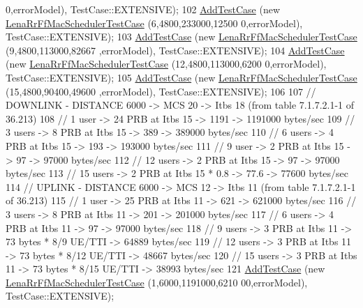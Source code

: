 \begin{DoxyCode}
      0,errorModel), TestCase::EXTENSIVE);
102   \hyperlink{classns3_1_1TestCase_a3718088e3eefd5d6454569d2e0ddd835}{AddTestCase} (\textcolor{keyword}{new} \hyperlink{classLenaRrFfMacSchedulerTestCase}{LenaRrFfMacSchedulerTestCase} (6,4800,233000,12500
      0,errorModel), TestCase::EXTENSIVE);
103   \hyperlink{classns3_1_1TestCase_a3718088e3eefd5d6454569d2e0ddd835}{AddTestCase} (\textcolor{keyword}{new} \hyperlink{classLenaRrFfMacSchedulerTestCase}{LenaRrFfMacSchedulerTestCase} (9,4800,113000,82667
      ,errorModel), TestCase::EXTENSIVE);
104   \hyperlink{classns3_1_1TestCase_a3718088e3eefd5d6454569d2e0ddd835}{AddTestCase} (\textcolor{keyword}{new} \hyperlink{classLenaRrFfMacSchedulerTestCase}{LenaRrFfMacSchedulerTestCase} (12,4800,113000,6200
      0,errorModel), TestCase::EXTENSIVE);
105   \hyperlink{classns3_1_1TestCase_a3718088e3eefd5d6454569d2e0ddd835}{AddTestCase} (\textcolor{keyword}{new} \hyperlink{classLenaRrFfMacSchedulerTestCase}{LenaRrFfMacSchedulerTestCase} (15,4800,90400,49600
      ,errorModel), TestCase::EXTENSIVE);
106 
107   \textcolor{comment}{// DOWNLINK - DISTANCE 6000 -> MCS 20 -> Itbs 18 (from table 7.1.7.2.1-1 of 36.213)}
108   \textcolor{comment}{// 1 user -> 24 PRB at Itbs 15 -> 1191 -> 1191000 bytes/sec}
109   \textcolor{comment}{// 3 users -> 8 PRB at Itbs 15 -> 389 -> 389000 bytes/sec}
110   \textcolor{comment}{// 6 users -> 4 PRB at Itbs 15 -> 193 -> 193000 bytes/sec}
111   \textcolor{comment}{// 9 user -> 2 PRB at Itbs 15 -> 97 -> 97000 bytes/sec}
112   \textcolor{comment}{// 12 users -> 2 PRB at Itbs 15 -> 97 -> 97000 bytes/sec}
113   \textcolor{comment}{// 15 users -> 2 PRB at Itbs 15 * 0.8 -> 77.6 -> 77600 bytes/sec}
114   \textcolor{comment}{// UPLINK - DISTANCE 6000 -> MCS 12 -> Itbs 11 (from table 7.1.7.2.1-1 of 36.213)}
115   \textcolor{comment}{// 1 user -> 25 PRB at Itbs 11 -> 621 -> 621000 bytes/sec}
116   \textcolor{comment}{// 3 users -> 8 PRB at Itbs 11 -> 201 -> 201000 bytes/sec}
117   \textcolor{comment}{// 6 users -> 4 PRB at Itbs 11 -> 97 -> 97000 bytes/sec}
118   \textcolor{comment}{// 9 users -> 3 PRB at Itbs 11 -> 73 bytes * 8/9 UE/TTI -> 64889 bytes/sec}
119   \textcolor{comment}{// 12 users -> 3 PRB at Itbs 11 -> 73 bytes * 8/12 UE/TTI -> 48667 bytes/sec}
120   \textcolor{comment}{// 15 users -> 3 PRB at Itbs 11 -> 73 bytes * 8/15 UE/TTI -> 38993 bytes/sec}
121   \hyperlink{classns3_1_1TestCase_a3718088e3eefd5d6454569d2e0ddd835}{AddTestCase} (\textcolor{keyword}{new} \hyperlink{classLenaRrFfMacSchedulerTestCase}{LenaRrFfMacSchedulerTestCase} (1,6000,1191000,6210
      00,errorModel), TestCase::EXTENSIVE);

\end{DoxyCode}
